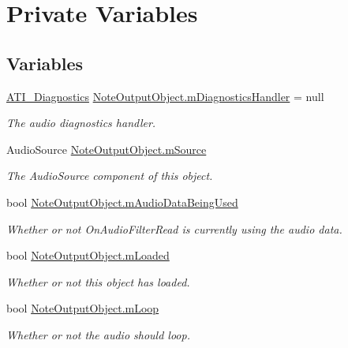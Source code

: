 \hypertarget{group___n_o_o_priv_var}{}\section{Private Variables}
\label{group___n_o_o_priv_var}
\subsection*{Variables}
\begin{DoxyCompactItemize}
\item 
\hyperlink{group___audio_testing_class_a_t_i___diagnostics}{A\+T\+I\+\_\+\+Diagnostics} \hyperlink{group___n_o_o_priv_var_gacd4376d2314caafc831cc049e9ca58d8}{Note\+Output\+Object.\+m\+Diagnostics\+Handler} = null
\begin{DoxyCompactList}\small\item\em The audio diagnostics handler. \end{DoxyCompactList}\item 
Audio\+Source \hyperlink{group___n_o_o_priv_var_gad5e14a91b348e61166dbf6b6cf13649c}{Note\+Output\+Object.\+m\+Source}
\begin{DoxyCompactList}\small\item\em The Audio\+Source component of this object. \end{DoxyCompactList}\item 
bool \hyperlink{group___n_o_o_priv_var_ga1efa96121f085b27c7d9e8725f90a336}{Note\+Output\+Object.\+m\+Audio\+Data\+Being\+Used}
\begin{DoxyCompactList}\small\item\em Whether or not On\+Audio\+Filter\+Read is currently using the audio data. \end{DoxyCompactList}\item 
bool \hyperlink{group___n_o_o_priv_var_gaf01d2583555de6a523cdf82808718ca9}{Note\+Output\+Object.\+m\+Loaded}
\begin{DoxyCompactList}\small\item\em Whether or not this object has loaded. \end{DoxyCompactList}\item 
bool \hyperlink{group___n_o_o_priv_var_gabf1d5013f44773e9fd3e4dbb59d74aeb}{Note\+Output\+Object.\+m\+Loop}
\begin{DoxyCompactList}\small\item\em Whether or not the audio should loop. \end{DoxyCompactList}\item 

\end{DoxyCompactItemize}

